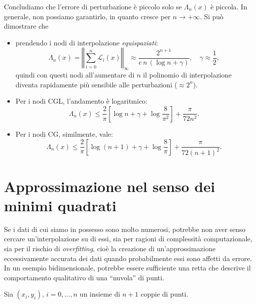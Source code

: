 Concludiamo che l'errore di perturbazione è piccolo solo se $\Lambda_{n}(x)$ è piccola. In generale, non possiamo garantirlo, in quanto cresce per $n\rightarrow +\infty $. Si può dimostrare che
\begin{itemize}
    \item prendendo i nodi di interpolazione \textit{equispaziati}:
        \begin{equation*}
            \Lambda _{n}(x) =\left\Vert \sum ^{n}_{i=0}\mathcal{L}_{i}(x)\right\Vert _{\infty } \approx \frac{2^{n+1}}{e\, n\, (\log n+\gamma )} ,\quad\gamma \approx \frac{1}{2} ,
        \end{equation*}
    quindi con questi nodi all'aumentare di $n$ il polinomio di interpolazione diventa rapidamente più sensibile alle perturbazioni ($\approx 2^n$).
    \item Per i nodi CGL, l'andamento è logaritmico:
    $$\Lambda _{n}(x) \leqslant \frac{2}{\pi }\left[\log n+\gamma +\log\frac{8}{\pi ^{2}}\right] +\frac{\pi }{72n^{2}}.$$
    \item Per i nodi CG, similmente, vale:
    $$\Lambda _{n}(x) \leqslant \frac{2}{\pi }\left[\log( n+1) +\gamma +\log\frac{8}{\pi }\right] +\frac{\pi }{72( n+1)^{2}}.$$
        
\end{itemize}

\section{Approssimazione nel senso dei minimi quadrati}
Se i dati di cui siamo in possesso sono molto numerosi, potrebbe non aver senso cercare un'interpolazione su di essi, sia per ragioni di complessità computazionale, sia per il rischio di \textit{overfitting}, cioè la creazione di un'approssimazione eccessivamente accurata dei dati quando probabilmente essi sono affetti da errore.
In un esempio bidimensionale, potrebbe essere sufficiente una retta che descrive il comportamento qualitativo di una ``nuvola'' di punti.

Sia $( x_{i} ,y_{i})$, $i=0,\dotsc ,n$ un insieme di $n+1$ coppie di punti.


